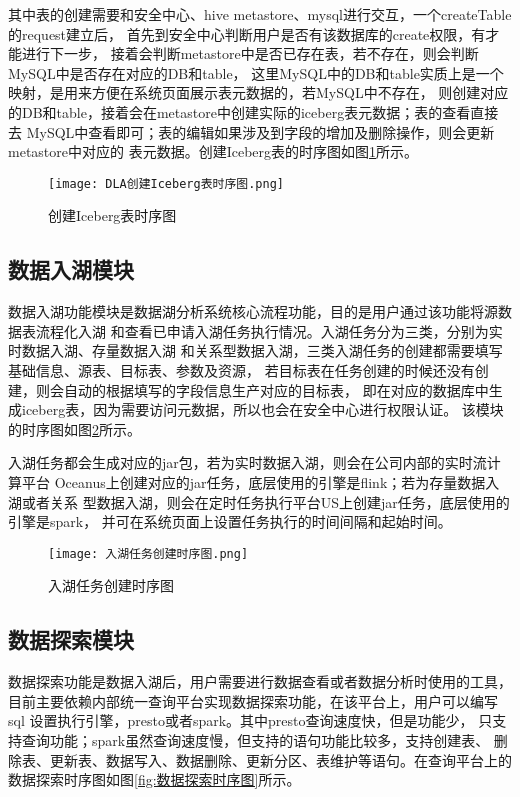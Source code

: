 其中表的创建需要和安全中心、hive metastore、mysql进行交互，一个createTable的request建立后，
首先到安全中心判断用户是否有该数据库的create权限，有才能进行下一步，
接着会判断metastore中是否已存在表，若不存在，则会判断MySQL中是否存在对应的DB和table，
这里MySQL中的DB和table实质上是一个映射，是用来方便在系统页面展示表元数据的，若MySQL中不存在，
则创建对应的DB和table，接着会在metastore中创建实际的iceberg表元数据；表的查看直接去
MySQL中查看即可；表的编辑如果涉及到字段的增加及删除操作，则会更新metastore中对应的
表元数据。创建Iceberg表的时序图如图\ref{fig:创建Iceberg表时序图}所示。

\begin{figure}[H]
  \centering
  \texttt{[image: DLA创建Iceberg表时序图.png]}
  \caption{创建Iceberg表时序图}
  \label{fig:创建Iceberg表时序图}
\end{figure}

\subsection{数据入湖模块}

数据入湖功能模块是数据湖分析系统核心流程功能，目的是用户通过该功能将源数据表流程化入湖
和查看已申请入湖任务执行情况。入湖任务分为三类，分别为实时数据入湖、存量数据入湖
和关系型数据入湖，三类入湖任务的创建都需要填写基础信息、源表、目标表、参数及资源，
若目标表在任务创建的时候还没有创建，则会自动的根据填写的字段信息生产对应的目标表，
即在对应的数据库中生成iceberg表，因为需要访问元数据，所以也会在安全中心进行权限认证。
该模块的时序图如图\ref{fig:入湖任务创建时序图}所示。

入湖任务都会生成对应的jar包，若为实时数据入湖，则会在公司内部的实时流计算平台
Oceanus上创建对应的jar任务，底层使用的引擎是flink；若为存量数据入湖或者关系
型数据入湖，则会在定时任务执行平台US上创建jar任务，底层使用的引擎是spark，
并可在系统页面上设置任务执行的时间间隔和起始时间。

\begin{figure}[H]
  \centering
  \texttt{[image: 入湖任务创建时序图.png]}
  \caption{入湖任务创建时序图}
  \label{fig:入湖任务创建时序图}
\end{figure}

\subsection{数据探索模块}

数据探索功能是数据入湖后，用户需要进行数据查看或者数据分析时使用的工具，
目前主要依赖内部统一查询平台实现数据探索功能，在该平台上，用户可以编写sql
设置执行引擎，presto或者spark。其中presto查询速度快，但是功能少，
只支持查询功能；spark虽然查询速度慢，但支持的语句功能比较多，支持创建表、
删除表、更新表、数据写入、数据删除、更新分区、表维护等语句。在查询平台上的数据探索时序图如图\ref{fig:数据探索时序图}所示。

